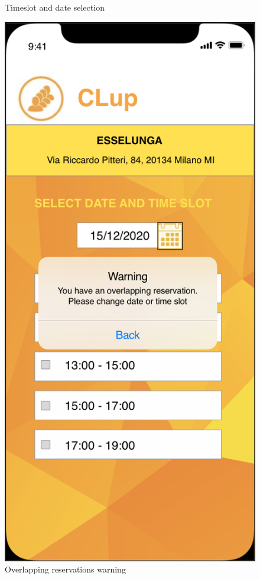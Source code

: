 \documentclass{article}
\begin{document}
\begin{figure}[H]
\begin{minipage}[b]{0.4\textwidth}
\caption{Timeslot and date selection}
\end{minipage}
\hfill
\begin{minipage}[b]{0.4\textwidth}
\centering
\includegraphics[width=\textwidth]{Warning.png}
\caption{Overlapping reservations warning}
\end{minipage}
\end{figure}
\end{document}
